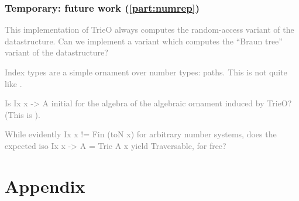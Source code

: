 \documentclass[10pt]{article}
\theoremstyle{plain}
\theoremstyle{definition}
\newcommand{\investigate}[1]{\par\vspace{1\baselineskip}\textcolor{gray}{#1}\vspace{1\baselineskip}\par}
\begin{document}
\section{Temporary: future work (\autoref{part:numrep})}

\investigate{This implementation of TrieO always computes the random-access variant of the datastructure. Can we implement a variant which computes the ``Braun tree'' variant of the datastructure?}

\investigate{Index types are a simple ornament over number types: paths. This is not quite like \cite{glookup}.}

\investigate{Is Ix x -> A initial for the algebra of the algebraic ornament induced by TrieO? (This is \cite{calcdata}).}

\investigate{While evidently Ix x != Fin (toN x) for arbitrary number systems, does the expected iso Ix x -> A = Trie A x yield Traversable, for free?}



\printbibliography

\part{Appendix}

\end{document}
